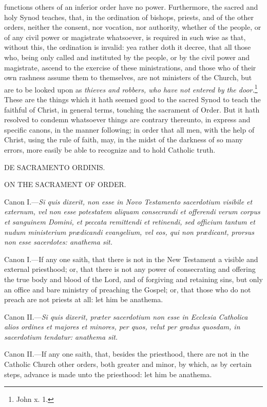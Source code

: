 functions others of an inferior order have no power. Furthermore, the sacred and holy Synod teaches, that, in the ordination of bishops, priests, and of the other orders, neither the consent, nor vocation, nor authority, whether of the people, or of any civil power or magistrate whatsoever, is required in such wise as that, without this, the ordination is invalid: yea rather doth it decree, that all those who, being only called and instituted by the people, or by the civil power and magistrate, ascend to the exercise of these ministrations, and those who of their own rashness assume them to themselves, are not ministers of the Church, but are to be looked upon as \emph{thieves and robbers, who have not entered by the door.}\footnote{\par   John x. 1.} These are the things which it hath seemed good to the sacred Synod to teach the faithful of Christ, in general terms, touching the sacrament of Order. But it hath resolved to condemn whatsoever things are contrary thereunto, in express and specific canons, in the manner following; in order that all men, with the help of Christ, using the rule of faith, may, in the midst of the darkness of so many errors, more easily be able to recognize and to hold Catholic truth.

DE SACRAMENTO ORDINIS.

ON THE SACRAMENT OF ORDER.

Canon I.—\emph{Si quis dixerit, non esse in Novo Testamento sacerdotium visibile et externum, vel non esse potestatem aliquam consecrandi et offerendi verum corpus et sanguinem Domini, et peccata remittendi et retinendi, sed officium tantum et nudum ministerium prædicandi evangelium, vel eos, qui non prædicant, prorsus non esse sacerdotes: anathema sit.}

Canon I.—If any one saith, that there is not in the New Testament a visible and external priesthood; or, that there is not any power of consecrating and offering the true body and blood of the Lord, and of forgiving and retaining sins, but only an office and bare ministry of preaching the Gospel; or, that those who do not preach are not priests at all: let him be anathema.

Canon II.—\emph{Si quis dixerit, præter sacerdotium non esse in Ecclesia Catholica alios ordines et majores et minores, per quos, velut per gradus quosdam, in sacerdotium tendatur: anathema sit.}

Canon II.—If any one saith, that, besides the priesthood, there are not in the Catholic Church other orders, both greater and minor, by which, as by certain steps, advance is made unto the priesthood: let him be anathema.

